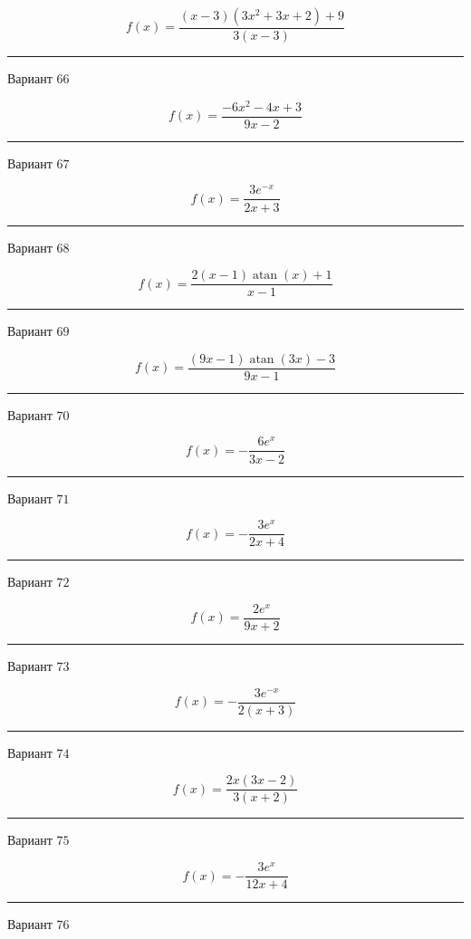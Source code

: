 \documentclass[11pt]{report}
\begin{document}
$$f(x) = \frac{\left(x - 3\right) \left(3 x^{2} + 3 x + 2\right) + 9}{3 \left(x - 3\right)}$$
\begin{center}
\noindent\rule{8cm}{0.4pt}
\end{center}
Вариант $66$


$$f(x) = \frac{- 6 x^{2} - 4 x + 3}{9 x - 2}$$
\begin{center}
\noindent\rule{8cm}{0.4pt}
\end{center}
Вариант $67$


$$f(x) = \frac{3 e^{- x}}{2 x + 3}$$
\begin{center}
\noindent\rule{8cm}{0.4pt}
\end{center}
Вариант $68$


$$f(x) = \frac{2 \left(x - 1\right) \operatorname{atan}{\left(x \right)} + 1}{x - 1}$$
\begin{center}
\noindent\rule{8cm}{0.4pt}
\end{center}
Вариант $69$


$$f(x) = \frac{\left(9 x - 1\right) \operatorname{atan}{\left(3 x \right)} - 3}{9 x - 1}$$
\begin{center}
\noindent\rule{8cm}{0.4pt}
\end{center}
Вариант $70$


$$f(x) = - \frac{6 e^{x}}{3 x - 2}$$
\begin{center}
\noindent\rule{8cm}{0.4pt}
\end{center}
Вариант $71$


$$f(x) = - \frac{3 e^{x}}{2 x + 4}$$
\begin{center}
\noindent\rule{8cm}{0.4pt}
\end{center}
Вариант $72$


$$f(x) = \frac{2 e^{x}}{9 x + 2}$$
\begin{center}
\noindent\rule{8cm}{0.4pt}
\end{center}
Вариант $73$


$$f(x) = - \frac{3 e^{- x}}{2 \left(x + 3\right)}$$
\begin{center}
\noindent\rule{8cm}{0.4pt}
\end{center}
Вариант $74$


$$f(x) = \frac{2 x \left(3 x - 2\right)}{3 \left(x + 2\right)}$$
\begin{center}
\noindent\rule{8cm}{0.4pt}
\end{center}
Вариант $75$


$$f(x) = - \frac{3 e^{x}}{12 x + 4}$$
\begin{center}
\noindent\rule{8cm}{0.4pt}
\end{center}
Вариант $76$
\end{document}
